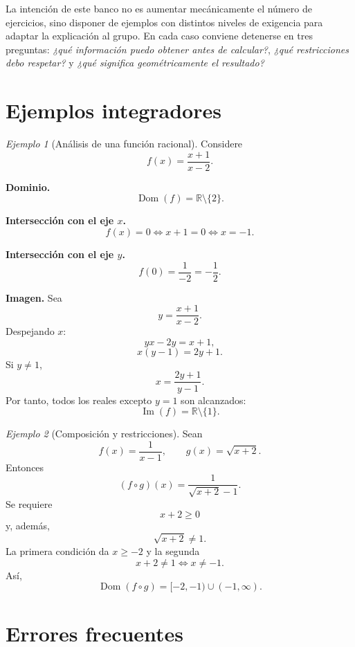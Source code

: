 \documentclass[12pt]{article}
\theoremstyle{remark}
\newtheorem{ejemplo}{Ejemplo}[section]
\newcommand{\R}{\mathbb{R}}
\newcommand{\Dom}{\operatorname{Dom}}
\newcommand{\Ima}{\operatorname{Im}}
\begin{document}
La intención de este banco no es aumentar mecánicamente el número de ejercicios, sino disponer de ejemplos con distintos niveles de exigencia para adaptar la explicación al grupo. En cada caso conviene detenerse en tres preguntas: \emph{¿qué información puedo obtener antes de calcular?}, \emph{¿qué restricciones debo respetar?} y \emph{¿qué significa geométricamente el resultado?}


\section{Ejemplos integradores}

\begin{ejemplo}[Análisis de una función racional]
Considere
\[
f(x)=\frac{x+1}{x-2}.
\]

\textbf{Dominio.}
\[
\Dom(f)=\R\setminus\{2\}.
\]

\textbf{Intersección con el eje $x$.}
\[
f(x)=0
\Longleftrightarrow x+1=0
\Longleftrightarrow x=-1.
\]

\textbf{Intersección con el eje $y$.}
\[
f(0)=\frac{1}{-2}=-\frac12.
\]

\textbf{Imagen.}
Sea
\[
y=\frac{x+1}{x-2}.
\]
Despejando $x$:
\[
yx-2y=x+1,
\]
\[
x(y-1)=2y+1.
\]
Si $y\neq1$,
\[
x=\frac{2y+1}{y-1}.
\]
Por tanto, todos los reales excepto $y=1$ son alcanzados:
\[
\Ima(f)=\R\setminus\{1\}.
\]
\end{ejemplo}

\begin{ejemplo}[Composición y restricciones]
Sean
\[
f(x)=\frac{1}{x-1},
\qquad
g(x)=\sqrt{x+2}.
\]
Entonces
\[
(f\circ g)(x)
=\frac{1}{\sqrt{x+2}-1}.
\]
Se requiere
\[
x+2\geq0
\]
y, además,
\[
\sqrt{x+2}\neq1.
\]
La primera condición da $x\geq-2$ y la segunda
\[
x+2\neq1\Longleftrightarrow x\neq-1.
\]
Así,
\[
\Dom(f\circ g)=[-2,-1)\cup(-1,\infty).
\]
\end{ejemplo}

\section{Errores frecuentes}
\end{document}
